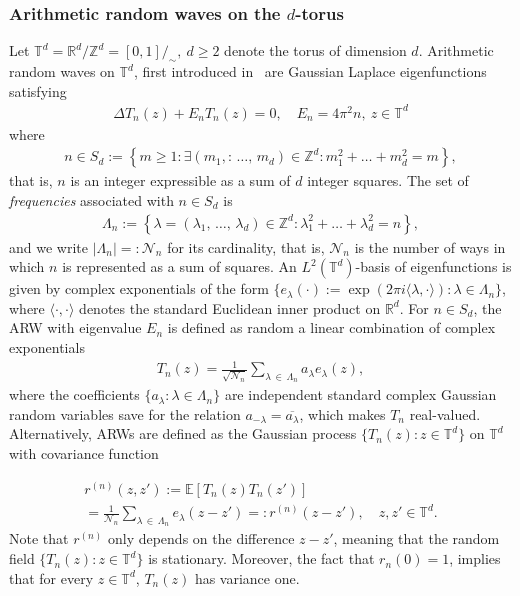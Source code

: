 \documentclass[AHL,Unicode,longabstracts,published]{cedram}
\newcommand{\R}{\mathbb{R}}
\newcommand{\Z}{\mathbb{Z}}
\newcommand{\tor}[1]{\mathbb{T}^{#1}}
\newcommand{\E}[1]{\mathbb{E}\left[#1\right]}
\newcommand{\scal}[2]{\langle #1,#2\rangle}
\newcommand{\Nn}{\mathcal{N}_n}
\let\oldexists\exists
\renewcommand*{\exists}{\mathrel{\oldexists}}
\begin{document}
\subsubsection*{Arithmetic random waves on the $d$-torus}
Let $\tor{d}=\R^d/\Z^d=[0,1]/_{\sim}, \ d\geq2$ denote the torus of dimension $d$. Arithmetic random waves on $\tor{d}$, first introduced in~\cite{ORW08,RW08} are Gaussian Laplace eigenfunctions satisfying
\begin{gather*}
\Delta T_n(z) + E_n T_n(z) = 0, \quad E_n=4\pi^2 n, \ z \in \tor{d}
\end{gather*}
where
\begin{gather*}
n \in S_d:=\left\{ m\geq 1: \exists (m_1,:\,\ldots,\,m_d)\in \Z^d: m_1^2+\ldots+m_d^2=m\right\},
\end{gather*}
that is, $n$ is an integer expressible as a sum of $d$ integer squares. The set of \emph{frequencies} associated with $n\in S_d$ is
\begin{gather*}
\Lambda_n:=\left\{ \lambda=(\lambda_1,\,\ldots,\,\lambda_d)\in \Z^d: \lambda_1^2+\ldots+\lambda_d^2=n\right\},
\end{gather*}
and we write $|\Lambda_n|=:\Nn$ for its cardinality, that is, $\Nn$ is the number of ways in which $n$ is represented as a sum of squares. An $L^2(\tor{d})$-basis of eigenfunctions is given by complex exponentials of the form $\{e_{\lambda}(\cdot):=\exp(2\pi i \scal{\lambda}{\cdot}):\lambda\in \Lambda_n\}$, where $\scal{\cdot}{\cdot}$ denotes the standard Euclidean inner product on $\R^d$. For $n \in S_d$, the ARW with eigenvalue $E_n$ is defined as random a linear combination of complex exponentials
\begin{gather}\label{Tn}
T_n(z) = \frac{1}{\sqrt{\Nn}} \sum_{\lambda\,\in\,\Lambda_n} a_{\lambda}e_{\lambda}(z),
\end{gather}
where the coefficients $\{a_{\lambda}:\lambda\in \Lambda_n\}$ are independent standard complex Gaussian random variables save for the relation $a_{-\lambda}=\overline{a_{\lambda}}$, which makes $T_n$ real-valued. Alternatively, ARWs are defined as the Gaussian process $\{T_n(z):z \in \tor{d}\}$ on $\tor{d}$ with covariance function

\begin{multline}\label{rn}
r^{(n)}(z,z'):=\E{T_n(z)T_n(z')} \\
= \frac{1}{\Nn}\sum_{\lambda\,\in\, \Lambda_n} e_{\lambda}(z-z')=:r^{(n)}(z-z'), \quad z,z' \in \tor{d}.
\end{multline}
Note that $r^{(n)}$ only depends on the difference $z-z'$, meaning that the random field $\{T_n(z): z \in \tor{d}\}$ is stationary. Moreover, the fact that $r_n(0)=1$, implies that for every $z\in \tor{d}$, $T_n(z)$ has variance one.
\end{document}
